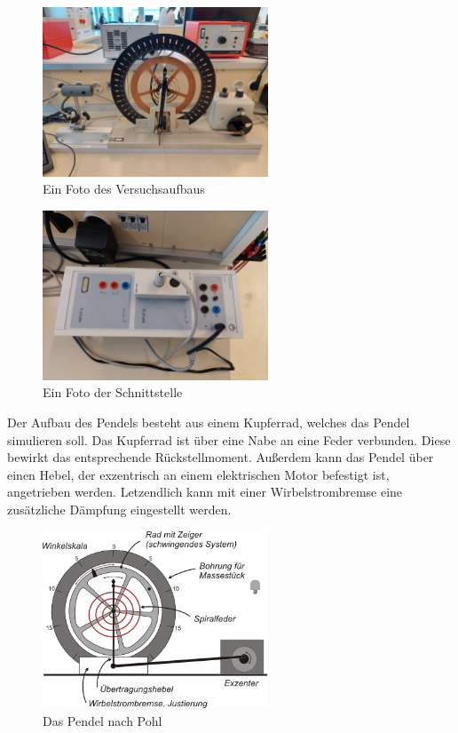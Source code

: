 \documentclass{article}
\begin{document}
\begin{figure}[H]
    \centering
    \includegraphics[width=0.6\textwidth]{bilder/drehpendel.jpg}
    \caption{Ein Foto des Versuchsaufbaus}
    \label{fig:versuchsaufbau}
\end{figure}

\begin{figure}[H]
    \centering
    \includegraphics[width=0.6\textwidth]{bilder/sensor_cassy.jpg}
    \caption{Ein Foto der Schnittstelle}
    \label{fig:schnittstelle}
\end{figure}

Der Aufbau des Pendels \cite{w:pohl} besteht aus einem Kupferrad, welches das Pendel simulieren soll.
Das Kupferrad ist über eine Nabe an eine Feder verbunden. Diese bewirkt das entsprechende
Rückstellmoment. Außerdem kann das Pendel über einen Hebel, der exzentrisch an einem
elektrischen Motor befestigt ist, angetrieben werden. Letzendlich kann mit einer Wirbelstrombremse
eine zusätzliche Dämpfung eingestellt werden.

\begin{figure}[H]
    \centering
    \includegraphics[width=0.6\textwidth]{bilder/drehpendel_pohl.png}
    \caption{Das Pendel nach Pohl \cite{w:pohl_drehpendel}}
    \label{fig:pendel}
\end{figure}
\end{document}
